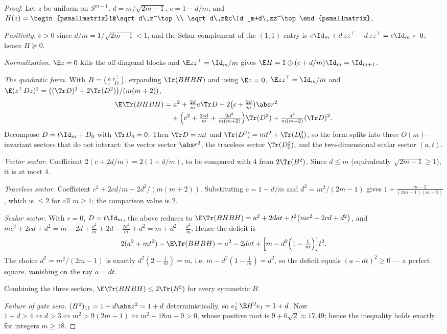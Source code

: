 \documentclass[../main.tex]{subfiles}
\begin{document}
\begin{proof}
Let $z$ be uniform on $S^{m-1}$, $d=m/\sqrt{2m-1}$, $c=1-d/m$, and
$H(z)=\begin{psmallmatrix}1&\sqrt d\,z^\top\\ \sqrt d\,z&c\Id_m+d\,zz^\top\end{psmallmatrix}$.

\emph{Positivity.} $c>0$ since $d/m=1/\sqrt{2m-1}<1$, and the Schur complement of the
$(1,1)$ entry is $c\Id_m+d\,zz^\top-d\,zz^\top=c\Id_m\succ0$; hence $H\succeq0$.

\emph{Normalization.} $\E z=0$ kills the off-diagonal blocks and $\E zz^\top=\Id_m/m$ gives
$\E H=1\oplus(c+d/m)\Id_m=\Id_{m+1}$.

\emph{The quadratic form.} With $B=\begin{psmallmatrix}a&r^\top\\r&D\end{psmallmatrix}$,
expanding $\Tr(BHBH)$ and using $\E z=0$, $\E zz^\top=\Id_m/m$ and
$\E(z^\top Dz)^2=\bigl((\Tr D)^2+2\Tr(D^2)\bigr)/(m(m+2))$,
\begin{align*}
  \E\Tr(BHBH)&=a^2+\tfrac{2d}ma\Tr D+2\bigl(c+\tfrac{2d}m\bigr)\abs r^2\\
  &\quad+\Bigl(c^2+\tfrac{2cd}m+\tfrac{2d^2}{m(m+2)}\Bigr)\Tr(D^2)
   +\tfrac{d^2}{m(m+2)}(\Tr D)^2 .
\end{align*}
Decompose $D=t\Id_m+D_0$ with $\Tr D_0=0$. Then $\Tr D=mt$ and $\Tr(D^2)=mt^2+\Tr(D_0^2)$, so
the form splits into three $O(m)$-invariant sectors that do not interact: the vector sector
$\abs r^2$, the traceless sector $\Tr(D_0^2)$, and the two-dimensional scalar sector $(a,t)$.

\emph{Vector sector.} Coefficient $2(c+2d/m)=2(1+d/m)$, to be compared with $4$ from
$2\Tr(B^2)$. Since $d\le m$ (equivalently $\sqrt{2m-1}\ge1$), it is at most $4$.

\emph{Traceless sector.} Coefficient
$c^2+2cd/m+2d^2/(m(m+2))$. Substituting $c=1-d/m$ and $d^2=m^2/(2m-1)$ gives
$1+\frac{m-2}{(2m-1)(m+2)}$, which is $\le2$ for all $m\ge1$; the comparison value is $2$.

\emph{Scalar sector.} With $r=0$, $D=t\Id_m$, the above reduces to
$\E\Tr(BHBH)=a^2+2dat+t^2\bigl(mc^2+2cd+d^2\bigr)$, and
$mc^2+2cd+d^2=m-2d+\tfrac{d^2}m+2d-\tfrac{2d^2}m+d^2=m+d^2-\tfrac{d^2}m$. Hence the deficit is
\[
  2(a^2+mt^2)-\E\Tr(BHBH)=a^2-2dat+\Bigl[m-d^2\Bigl(1-\tfrac1m\Bigr)\Bigr]t^2 .
\]
The choice $d^2=m^2/(2m-1)$ is exactly $d^2(2-\tfrac1m)=m$, i.e.
$m-d^2(1-\tfrac1m)=d^2$, so the deficit equals $(a-dt)^2\ge0$ --- a perfect square, vanishing on
the ray $a=dt$.

Combining the three sectors, $\E\Tr(BHBH)\le2\Tr(B^2)$ for every symmetric $B$.

\emph{Failure of gate zero.} $(H^2)_{11}=1+d\abs z^2=1+d$ deterministically, so
$e_1^\top\E H^2e_1=1+d$. Now $1+d>4\iff d>3\iff m^2>9(2m-1)\iff m^2-18m+9>0$, whose positive
root is $9+6\sqrt2\approx17.49$; hence the inequality holds exactly for integers $m\ge18$.
\end{proof}
\end{document}
